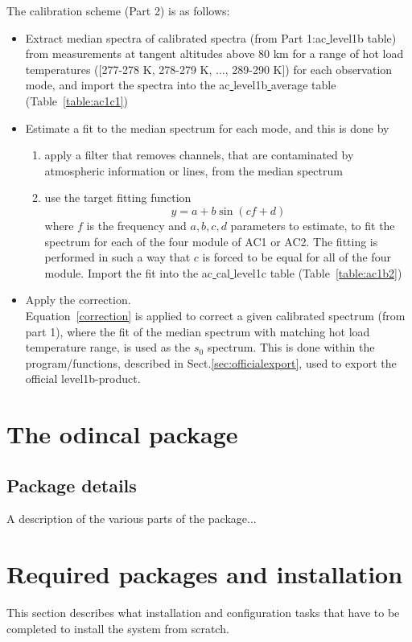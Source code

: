 \documentclass[12pt]{article}
\begin{document}
The calibration scheme (Part 2) is as follows:
\begin{itemize}
\item Extract median spectra of calibrated spectra 
(from Part 1:ac\underline{ }level1b table) 
from measurements at tangent altitudes above 80 km for a range of hot load 
temperatures ([277-278 K, 278-279 K, ..., 289-290 K]) 
for each observation mode, and import the spectra
into the ac\underline{ }level1b\underline{ }average table
(Table~\ref{table:ac1c1})
\item Estimate a fit to the median spectrum for each mode, and this is done
by
\begin{enumerate}
\item apply a filter that removes channels, that are contaminated by 
atmospheric information or lines, from the median spectrum 
\item use the target fitting function  
\begin{equation}
y=a+ b\sin(cf+d)
\end{equation}
where \(f\) is the frequency and \(a,b,c,d\) parameters to estimate,
to fit the spectrum for each of the four module of AC1 or AC2.
The fitting is performed in such a way that \(c\) is forced 
to be equal for all of the four module. 
Import the fit into the ac\underline{ }cal\underline{ }level1c
table (Table~\ref{table:ac1b2})
\end{enumerate}
\item Apply the correction.\\
Equation~\ref{correction} is applied to correct a given calibrated 
spectrum (from part 1), where the fit of the median spectrum
with matching hot load temperature range, is used as the \(s_{0}\)
spectrum. 
This is done within the program/functions, described in
Sect.\ref{sec:officialexport}, used to export the official
level1b-product.  
\end{itemize}

      
  



\section{The odincal package}
\subsection{Package details}
A description of the various parts of the package...

\section{Required packages and installation}
This section describes what installation and configuration tasks that have to be completed to install the system from scratch.
\end{document}
